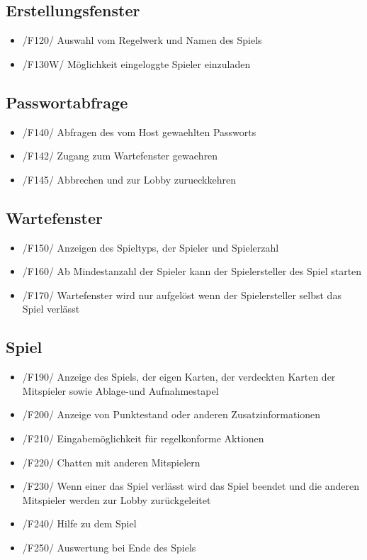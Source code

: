 \documentclass{article}
\begin{document}
\subsection{Erstellungsfenster}
\begin{itemize}
	\item /F120/ Auswahl vom \gls{Regelwerk} und  Namen des Spiels 
	\item /F130W/ Möglichkeit eingeloggte Spieler einzuladen
\end{itemize}

\subsection{Passwortabfrage}
\begin{itemize}
	\item /F140/ Abfragen des vom Host gewaehlten Passworts
	\item /F142/ Zugang zum Wartefenster gewaehren
	\item /F145/ Abbrechen und zur Lobby zurueckkehren
\end{itemize}

\subsection{Wartefenster}
\begin{itemize}
	\item /F150/ Anzeigen des Spieltyps, der Spieler und Spielerzahl
	\item /F160/ Ab Mindestanzahl der Spieler kann der Spielersteller des Spiel starten
	\item /F170/ Wartefenster wird nur aufgelöst wenn der Spielersteller selbst das Spiel verlässt
\end{itemize}

\subsection{Spiel}
\begin{itemize}
	\item /F190/ Anzeige des Spiels, der eigen Karten, der verdeckten Karten der Mitspieler sowie Ablage-und Aufnahmestapel
	\item /F200/ Anzeige von Punktestand oder anderen Zusatzinformationen
	\item /F210/ Eingabemöglichkeit für regelkonforme Aktionen
	\item /F220/ Chatten mit anderen Mitspielern
	\item /F230/ Wenn einer das Spiel verlässt wird das Spiel beendet und die anderen Mitspieler werden zur \gls{Lobby} zurückgeleitet
	\item /F240/ Hilfe zu dem Spiel
	\item /F250/ Auswertung bei Ende des Spiels
\end{itemize}
\end{document}
